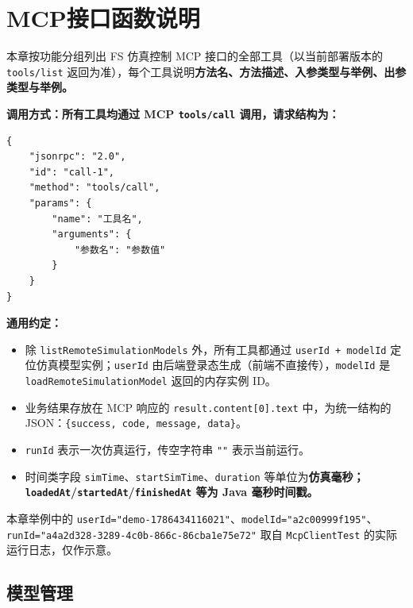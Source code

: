 \section{MCP接口函数说明}
本章按功能分组列出 FS 仿真控制 MCP 接口的全部工具（以当前部署版本的 \texttt{tools/list} 返回为准），每个工具说明\bf{方法名}、\bf{方法描述}、\bf{入参类型与举例}、\bf{出参类型与举例}。

\bf{调用方式}：所有工具均通过 MCP \texttt{tools/call} 调用，请求结构为：
\begin{lstlisting}
{
    "jsonrpc": "2.0",
    "id": "call-1",
    "method": "tools/call",
    "params": {
        "name": "工具名",
        "arguments": {
            "参数名": "参数值"
        }
    }
}
\end{lstlisting}\vspace{-30pt}
\bf{通用约定}：
\begin{itemize}
	\item 除 \texttt{listRemoteSimulationModels} 外，所有工具都通过 \texttt{userId + modelId} 定位仿真模型实例；\texttt{userId} 由后端登录态生成（前端不直接传），\texttt{modelId} 是 \texttt{loadRemoteSimulationModel} 返回的内存实例 ID。
	\item 业务结果存放在 MCP 响应的 \texttt{result.content[0].text} 中，为统一结构的 JSON：\texttt{\{success, code, message, data\}}。
	\item \texttt{runId} 表示一次仿真运行，传空字符串 \texttt{""} 表示当前运行。
	\item 时间类字段 \texttt{simTime}、\texttt{startSimTime}、\texttt{duration} 等单位为\bf{仿真毫秒}；\texttt{loadedAt}/\texttt{startedAt}/\texttt{finishedAt} 等为 Java 毫秒时间戳。
\end{itemize}
本章举例中的 \texttt{userId="demo-1786434116021"}、\texttt{modelId="a2c00999f195"}、\texttt{runId="a4a2d328-3289-4c0b-866c-86cba1e75e72"} 取自 \texttt{McpClientTest} 的实际运行日志，仅作示意。

\subsection{模型管理}

